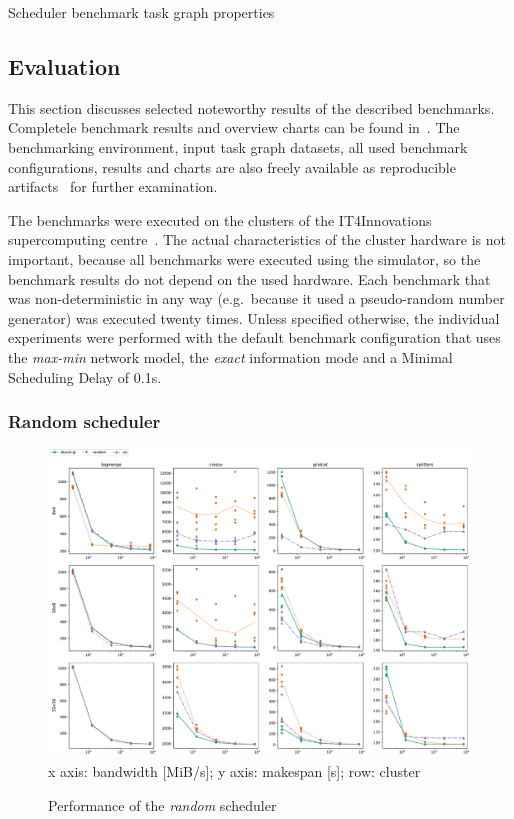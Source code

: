 \begin{table}
	\caption{Scheduler benchmark task graph properties}
	\label{tab:estee-graph-properties}
\end{table}

\subsection{Evaluation}
This section discusses selected noteworthy results of the described benchmarks. Completele
benchmark results and overview charts can be found in~\cite{estee}. The benchmarking
environment, input task graph datasets, all used benchmark configurations, results and charts are
also freely available as reproducible artifacts~\cite{estee_results} for further examination.

The benchmarks were executed on the clusters of the IT4Innovations supercomputing
centre~\cite{it4i}. The actual characteristics of the cluster hardware is not
important, because all benchmarks were executed using the \estee{} simulator, so the
benchmark results do not depend on the used hardware. Each benchmark that was non-deterministic in
any way (e.g.\ because it used a pseudo-random number generator) was executed twenty times. Unless
specified otherwise, the individual experiments were performed with the default benchmark
configuration that uses the \emph{max-min} network model, the \emph{exact}
information mode and a Minimal Scheduling Delay of 0.1s.

\subsubsection*{Random scheduler}

\begin{figure}
	\centering
	\includegraphics[width=\textwidth]{imgs/estee/charts/random-scheduler}\\
	{\small x axis: bandwidth [MiB/s]; y axis: makespan [s]; row: cluster}
	\caption{Performance of the \emph{random} scheduler}
	\label{fig:estee-chart-random-scheduler}
\end{figure}

